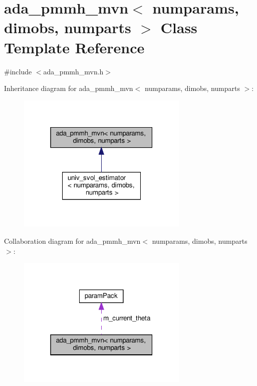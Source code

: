 \hypertarget{classada__pmmh__mvn}{}\section{ada\+\_\+pmmh\+\_\+mvn$<$ numparams, dimobs, numparts $>$ Class Template Reference}
\label{classada__pmmh__mvn}


{\ttfamily \#include $<$ada\+\_\+pmmh\+\_\+mvn.\+h$>$}



Inheritance diagram for ada\+\_\+pmmh\+\_\+mvn$<$ numparams, dimobs, numparts $>$\+:
\nopagebreak
\begin{figure}[H]
\begin{center}
\leavevmode
\includegraphics[width=232pt]{classada__pmmh__mvn__inherit__graph}
\end{center}
\end{figure}


Collaboration diagram for ada\+\_\+pmmh\+\_\+mvn$<$ numparams, dimobs, numparts $>$\+:
\nopagebreak
\begin{figure}[H]
\begin{center}
\leavevmode
\includegraphics[width=232pt]{classada__pmmh__mvn__coll__graph}
\end{center}
\end{figure}
